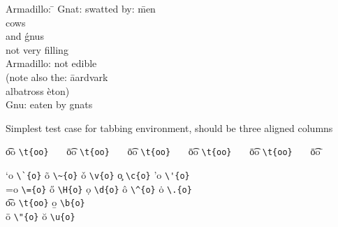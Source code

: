 \documentclass{article}
\begin{document}
\begin{table}
\begin{center}
\begin{tabbing}
Armadillo: \=							\kill
Gnat:      \> swatted by: \= men \+\+   \\
                             cows       \\
                      and \' gnus   \-  \\
              not very filling    \-    \\
Armadillo: \> not edible                \\
\pushtabs
(note also the: \= aardvark             \\
                \> albatross \` eton)   \\
\poptabs
Gnu:            \> eaten by  \>    gnats
\end{tabbing}
\caption{Simplest test case for tabbing environment, should be
three aligned columns}
\end{center}
\end{table}

\begin{table}
\centering
\begin{tabbing}
\t{oo} \= \verb|\t{oo}|~~~ \=
\t{oo} \= \verb|\t{oo}|~~~ \=
\t{oo} \= \verb|\t{oo}|~~~ \=
\t{oo} \= \verb|\t{oo}|~~~ \=
\t{oo} \= \verb|\t{oo}|~~~ \=
\t{oo} \=                       \kill

\a`{o} \> \verb|\`{o}|  \> \~{o}  \> \verb|\~{o}|  \> \v{o}  \> \verb|\v{o}| \>
\c{o}  \> \verb|\c{o}|  \> \a'{o} \> \verb|\'{o}|  \\
\a={o} \> \verb|\={o}|  \> \H{o}  \> \verb|\H{o}|  \> \d{o}  \> \verb|\d{o}| \>
\^{o}  \> \verb|\^{o}|  \> \.{o}  \> \verb|\.{o}|  \\
\t{oo} \> \verb|\t{oo}| \> \b{o}  \> \verb|\b{o}|  \\  \"{o} \> \verb|\"{o}| \>
\u{o}  \> \verb|\u{o}|  \\
\end{tabbing}
\caption{This does table does not really work on any RTF reader that I have.  Some
display the \verb|\H{o}| correctly because they support unicode, but fail with the
table formatting.  Others (like Word v.X for Macintosh) handle the table correctly,
but fail to support unicode.  Sigh.}
\end{table}
\end{document}
